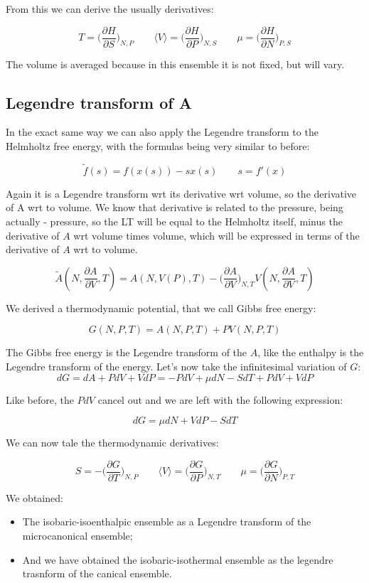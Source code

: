 From this we can derive the usually derivatives:

	$$T = \biggl(\frac{\partial H}{\partial S}\biggr)_{N, P} \qquad \langle V\rangle = \biggl(\frac{\partial H}{\partial P}\biggr)_{N, S} \qquad \mu = \biggl(\frac{\partial H}{\partial N}\biggr)_{P, S}$$
	
	The volume is averaged because in this ensemble it is not fixed, but will vary. 

	\subsection{Legendre transform of A}
	 In the exact same way we can also apply the Legendre transform to the Helmholtz free energy, with the formulas being very similar to before: 

	$$\tilde{f}(s) = f(x(s))-sx(s)\qquad s = f'(x)$$
	
	Again it is a Legendre transform wrt its derivative wrt volume, so the derivative of A wrt to volume. We know that derivative is related to the pressure, being actually - pressure, so the LT will be equal to the Helmholtz itself, minus the derivative of $A$ wrt volume times volume, which will be expressed in terms of the derivative of $A$ wrt to volume. 

	$$\tilde{A}(N, \frac{\partial A}{\partial V}, T) = A(N, V(P), T)- \biggl(\frac{\partial A}{\partial V}\biggr)_{N, T}V(N, \frac{\partial A}{\partial V}, T)$$
	
	We derived a thermodynamic potential, that we call Gibbs free energy:

	$$G(N, P, T) = A(N, P, T) + PV(N, P, T)$$

	The Gibbs free energy is the Legendre transform of the $A$, like the enthalpy is the Legendre transform of the energy. 
	Let's now take the infinitesimal variation of $G$: 
	$$dG = dA + PdV + VdP = -PdV + \mu dN - SdT + PdV + VdP$$
	
	Like before, the $PdV$ cancel out and we are left with the following expression:

	$$dG = \mu dN + VdP - SdT$$
	
	We can now tale the thermodynamic derivatives:

	$$S = -\biggl(\frac{\partial G}{\partial T}\biggr)_{N, P}\qquad\langle V\rangle = \biggl(\frac{\partial G}{\partial P}\biggr)_{N, T}\qquad \mu = \biggl(\frac{\partial G}{\partial N}\biggr)_{P, T}$$
	
	We obtained:
	\begin{itemize}
	\item The isobaric-isoenthalpic ensemble as a Legendre transform of the microcanonical ensemble;
	\item And we have obtained the isobaric-isothermal ensemble as the legendre trasnform of the canical ensemble.
	\end{itemize}
	
